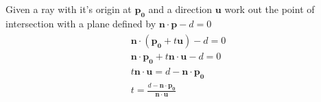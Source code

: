 \documentclass[12pt,pdftex,colorlinks]{report}
\begin{document}
Given a ray with it's origin at $\mathbf{p_0}$ and a direction $\mathbf{u}$ work
out the point of intersection with a plane defined by
$\mathbf{n}\cdot\mathbf{p}-d=0$
\begin{eqnarray}
\begin{split}
	\mathbf{n}\cdot(\mathbf{p_0} + t\mathbf{u}) - d = 0 \\
	\mathbf{n}\cdot\mathbf{p_0} + t\mathbf{n} \cdot \mathbf{u} - d = 0 \\
	t\mathbf{n} \cdot \mathbf{u} = d - \mathbf{n} \cdot \mathbf{p_0} \\
	t = \frac{d - \mathbf{n} \cdot \mathbf{p_0}}{\mathbf{n} \cdot \mathbf{u}}
\end{split}
\end{eqnarray}
\end{document}
